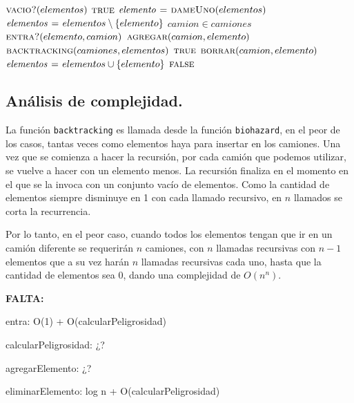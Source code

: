 \vspace*{0.5cm} 


\begin{codebox}
\li \If $\textnormal{\scshape vacio?}(elementos)$
\li     \Then
            \Return $\textnormal{\scshape true}$
        \End
\li $\id{elemento} \gets \proc{dameUno}(elementos)$
\li $\id{elementos} \gets elementos \setminus \{elemento\}$
\li \For $camion \in camiones$
\li     \Do
            \If $\textnormal{\scshape entra?}(elemento, camion)$
\li             \Then
                    $\textnormal{\scshape agregar}(camion, elemento)$
\li                 \If $\textnormal{\scshape backtracking}(camiones, elementos)$
                        \Then
\li                         \Return $\textnormal{\scshape true}$
\li                 \Else
\li                     $\textnormal{\scshape borrar}(camion, elemento)$
                    \End    
            \End
        \End
\li $\id{elementos} \gets elementos \cup \{elemento\}$
\li \Return $\textnormal{\scshape false}$
\end{codebox}



\subsection{Análisis de complejidad.}

\vspace*{0.3cm}


La función \verb|backtracking| es llamada desde la función \verb|biohazard|, en
el peor de los casos, tantas veces como elementos haya para insertar en los camiones.
Una vez que se comienza a hacer la recursión, por cada camión que podemos utilizar,
se vuelve a hacer con un elemento menos. La recursión finaliza en el momento en 
el que se la invoca con un conjunto vacío de elementos. Como la cantidad de 
elementos siempre disminuye en 1 con cada llamado recursivo, en $n$ llamados se
corta la recurrencia.

Por lo tanto, en el peor caso, cuando todos los elementos tengan que ir en un 
camión diferente se requerirán $n$ camiones, con $n$ llamadas recursivas con 
$n - 1$ elementos que a su vez harán $n$ llamadas recursivas cada uno, hasta que
la cantidad de elementos sea 0, dando una complejidad de $O(n^n)$.

\textbf{FALTA:}

entra: O(1) + O(calcularPeligrosidad)

calcularPeligrosidad: ¿?

agregarElemento: ¿?

eliminarElemento: log n + O(calcularPeligrosidad)

